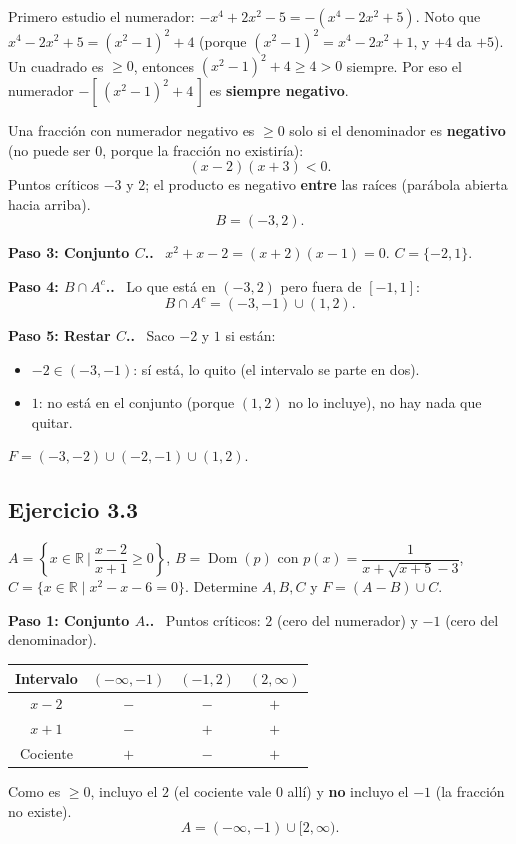 \documentclass[11pt,a4paper]{article}
\newcommand{\R}{\mathbb{R}}
\newcommand{\dom}{\operatorname{Dom}}
\newcommand{\paso}[1]{\par\medskip\noindent\textbf{\textcolor{blue!50!black}{Paso #1.}}\ }
\begin{document}
Primero estudio el numerador: $-x^4+2x^2-5=-(x^4-2x^2+5)$. Noto que $x^4-2x^2+5=(x^2-1)^2+4$ (porque $(x^2-1)^2=x^4-2x^2+1$, y $+4$ da $+5$).
Un cuadrado es $\ge0$, entonces $(x^2-1)^2+4\ge4>0$ siempre. Por eso el numerador $-[\,(x^2-1)^2+4\,]$ es \textbf{siempre negativo}.

Una fracción con numerador negativo es $\ge0$ solo si el denominador es \textbf{negativo} (no puede ser $0$, porque la fracción no existiría):
\[ (x-2)(x+3)<0. \]
Puntos críticos $-3$ y $2$; el producto es negativo \textbf{entre} las raíces (parábola abierta hacia arriba).
\[ B=(-3,2). \]

\paso{3: Conjunto $C$.} $x^2+x-2=(x+2)(x-1)=0$. $C=\{-2,1\}$.

\paso{4: $B\cap A^c$.} Lo que está en $(-3,2)$ pero fuera de $[-1,1]$:
\[ B\cap A^c=(-3,-1)\cup(1,2). \]

\paso{5: Restar $C$.} Saco $-2$ y $1$ si están:
\begin{itemize}[nosep]
  \item $-2\in(-3,-1)$: sí está, lo quito (el intervalo se parte en dos).
  \item $1$: no está en el conjunto (porque $(1,2)$ no lo incluye), no hay nada que quitar.
\end{itemize}
\begin{respuesta}
$F=(-3,-2)\cup(-2,-1)\cup(1,2).$
\end{respuesta}

\subsection{Ejercicio 3.3}
\begin{enunciado}
$A=\left\{x\in\R\ \Big|\ \dfrac{x-2}{x+1}\ge0\right\}$, \quad
$B=\dom(p)$ con $p(x)=\dfrac1{x+\sqrt{x+5}-3}$, \quad
$C=\{x\in\R\mid x^2-x-6=0\}$. Determine $A,B,C$ y $F=(A-B)\cup C$.
\end{enunciado}

\paso{1: Conjunto $A$.} Puntos críticos: $2$ (cero del numerador) y $-1$ (cero del denominador).
\begin{center}
\begin{tabular}{c|ccc}
Intervalo & $(-\infty,-1)$ & $(-1,2)$ & $(2,\infty)$\\ \hline
$x-2$ & $-$ & $-$ & $+$\\
$x+1$ & $-$ & $+$ & $+$\\ \hline
Cociente & $+$ & $-$ & $+$
\end{tabular}
\end{center}
Como es $\ge0$, incluyo el $2$ (el cociente vale $0$ allí) y \textbf{no} incluyo el $-1$ (la fracción no existe).
\[ A=(-\infty,-1)\cup[2,\infty). \]
\end{document}
